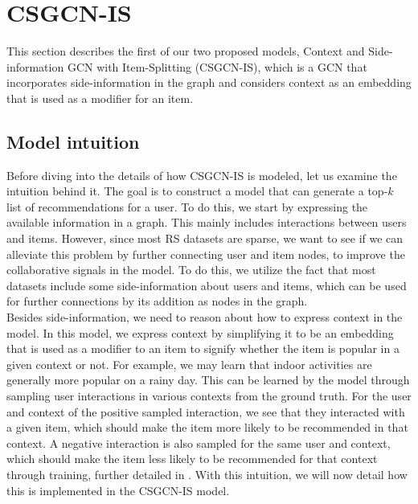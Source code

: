 \section{CSGCN-IS}\label{sec:csgcn_is}
This section describes the first of our two proposed models, Context and Side-information GCN with Item-Splitting (CSGCN-IS), which is a GCN that incorporates side-information in the graph and considers context as an embedding that is used as a modifier for an item.

\subsection{Model intuition}\label{subsec:csgcn_is_intuition}
Before diving into the details of how CSGCN-IS is modeled, let us examine the intuition behind it.
The goal is to construct a model that can generate a top-$k$ list of recommendations for a user.
To do this, we start by expressing the available information in a graph.
This mainly includes interactions between users and items.
However, since most RS datasets are sparse, we want to see if we can alleviate this problem by further connecting user and item nodes, to improve the collaborative signals in the model.
To do this, we utilize the fact that most datasets include some side-information about users and items, which can be used for further connections by its addition as nodes in the graph.\\
Besides side-information, we need to reason about how to express context in the model.
In this model, we express context by simplifying it to be an embedding that is used as a modifier to an item to signify whether the item is popular in a given context or not.
For example, we may learn that indoor activities are generally more popular on a rainy day.
This can be learned by the model through sampling user interactions in various contexts from the ground truth.
For the user and context of the positive sampled interaction, we see that they interacted with a given item, which should make the item more likely to be recommended in that context.
A negative interaction is also sampled for the same user and context, which should make the item less likely to be recommended for that context through training, further detailed in .
With this intuition, we will now detail how this is implemented in the CSGCN-IS model.

